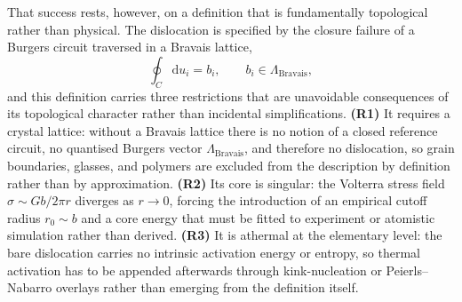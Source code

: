 \documentclass[5p,sort&compress]{elsarticle}
\begin{document}
That success rests, however, on a definition that is fundamentally
topological rather than physical. The dislocation is specified by
the closure failure of a Burgers circuit traversed in a Bravais
lattice,
\begin{equation}
  \oint_C \mathrm{d}u_i = b_i,\qquad b_i\in\Lambda_\mathrm{Bravais},
  \label{eq:burgers}
\end{equation}
and this definition carries three restrictions that are unavoidable
consequences of its topological character rather than incidental
simplifications. \textbf{(R1)} It requires a crystal lattice: without
a Bravais lattice there is no notion of a closed reference circuit,
no quantised Burgers vector $\Lambda_\mathrm{Bravais}$, and therefore
no dislocation, so grain boundaries, glasses, and polymers are
excluded from the description by definition rather than by
approximation. \textbf{(R2)} Its core is singular: the Volterra
stress field $\sigma\sim Gb/2\pi r$ diverges as $r\to0$, forcing the
introduction of an empirical cutoff radius $r_0\sim b$ and a core
energy that must be fitted to experiment or atomistic simulation
rather than derived. \textbf{(R3)} It is athermal at the elementary
level: the bare dislocation carries no intrinsic activation energy or
entropy, so thermal activation has to be appended afterwards through
kink-nucleation or Peierls--Nabarro overlays rather than emerging from
the definition itself.
\end{document}
